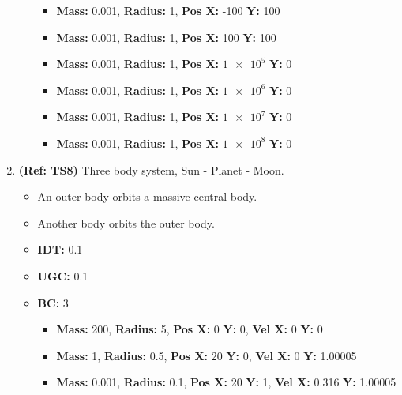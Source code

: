 \begin{enumerate}
\begin{itemize}
\begin{itemize}
    \item \textbf{Mass:} 0.001, \textbf{Radius:} 1, \textbf{Pos X:} -100 \textbf{Y:} 100
    \item \textbf{Mass:} 0.001, \textbf{Radius:} 1, \textbf{Pos X:} 100 \textbf{Y:} 100
    \item \textbf{Mass:} 0.001, \textbf{Radius:} 1, \textbf{Pos X:} $\num{1e5}$ \textbf{Y:} 0
    \item \textbf{Mass:} 0.001, \textbf{Radius:} 1, \textbf{Pos X:} $\num{1e6}$ \textbf{Y:} 0
    \item \textbf{Mass:} 0.001, \textbf{Radius:} 1, \textbf{Pos X:} $\num{1e7}$ \textbf{Y:} 0
    \item \textbf{Mass:} 0.001, \textbf{Radius:} 1, \textbf{Pos X:} $\num{1e8}$ \textbf{Y:} 0
    \end{itemize}
  \end{itemize}
  
  
\pagebreak
\item \textbf{(Ref: TS8)} Three body system, Sun - Planet - Moon.
  \begin{itemize}
  \item An outer body orbits a massive central body.
  \item Another body orbits the outer body.
  \item \textbf{IDT:} 0.1
  \item \textbf{UGC:} 0.1 
  \item \textbf{BC:} 3
    \begin{itemize}
    \item \textbf{Mass:} 200, \textbf{Radius:} 5, \textbf{Pos X:} 0 \textbf{Y:} 0, \textbf{Vel X:} 0 \textbf{Y:} 0
    \item \textbf{Mass:} 1, \textbf{Radius:} 0.5, \textbf{Pos X:} 20 \textbf{Y:} 0, \textbf{Vel X:} 0 \textbf{Y:} 1.00005
    \item \textbf{Mass:} 0.001, \textbf{Radius:} 0.1, \textbf{Pos X:} 20 \textbf{Y:} 1, \textbf{Vel X:} 0.316 \textbf{Y:} 1.00005
    \end{itemize}
  \end{itemize}
  

\end{enumerate}
